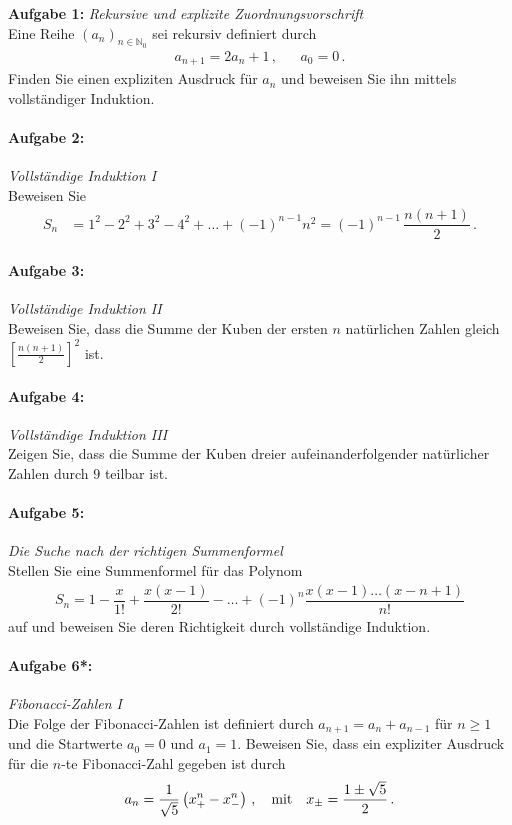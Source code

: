 
\textbf{Aufgabe 1: } \emph{Rekursive und explizite Zuordnungsvorschrift}\\[0.2cm]
Eine Reihe $(a_n)_{n\in\mathbb{N}_0}$ sei rekursiv definiert durch
\begin{align*}
a_{n+1}=2a_n+1\,, && a_0=0\,.
\end{align*}
Finden Sie einen expliziten Ausdruck für $a_n$ und beweisen Sie ihn mittels vollständiger Induktion.
%
%
\paragraph{Aufgabe 2: } \emph{Vollständige Induktion I}\\[0.2cm]
Beweisen Sie
\begin{align*}
S_n&=1^2-2^2+3^2-4^2+\hdots+(-1)^{n-1}n^2=(-1)^{n-1}\,\dfrac{n(n+1)}{2}\,.
\end{align*}
%
\paragraph{Aufgabe 3: } \emph{Vollständige Induktion II}\\[0.2cm]
Beweisen Sie, dass die Summe der Kuben der ersten $n$ natürlichen Zahlen gleich $\left[\frac{n(n+1)}{2}\right]^2$ ist. 
%
\paragraph{Aufgabe 4: } \emph{Vollständige Induktion III}\\[0.2cm]
Zeigen Sie, dass die Summe der Kuben dreier aufeinanderfolgender natürlicher Zahlen durch $9$ teilbar ist.
%
\paragraph{Aufgabe 5: } \emph{Die Suche nach der richtigen Summenformel}\\[0.2cm]
Stellen Sie eine Summenformel für das Polynom
\begin{align*}
S_n = 1-\dfrac{x}{1!}+\dfrac{x(x-1)}{2!}-\hdots+(-1)^n \dfrac{x(x-1)\dots(x-n+1)}{n!}
\end{align*}
auf und beweisen Sie deren Richtigkeit durch vollständige Induktion.
%
\paragraph{Aufgabe 6*: } \emph{Fibonacci-Zahlen I}\\[0.2cm]
Die Folge der Fibonacci-Zahlen ist definiert durch $a_{n+1}=a_n+a_{n-1}$ für $n\ge 1$ und die Startwerte $a_0=0$ und $a_1=1$. Beweisen Sie, dass ein expliziter Ausdruck für die $n$-te Fibonacci-Zahl gegeben ist durch
\begin{align*}
a_n=\frac{1}{\sqrt{5}}\left(x_+^n-x_-^n\right)\,, \qq{mit} x_{\pm}=\frac{1\pm\sqrt{5}}{2}\,.
\end{align*}